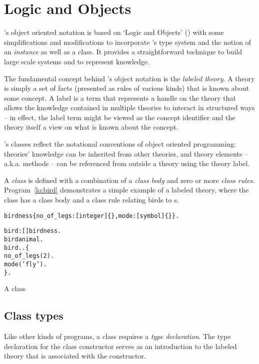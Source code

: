 \chapter{Logic and Objects}
\label{lo}

\go's object oriented notation is based on `Logic and Objects' (\cite{fgm:92}) with some simplifications and modifications to incorporate \go's type system and the notion of an \emph{instance} as well as a class. It provides a straightforward technique to build large scale systems and to represent knowledge. 

The fundamental concept behind \go's object notation is the \emph{labeled theory}. A theory is simply a set of facts (presented as rules of various kinds) that is known about some concept. A label is a term that represents a handle on the theory that allows the knowledge contained in multiple theories to interact in structured ways -- in effect, the label term might be viewed as the concept identifier and the theory itself a view on what is known about the concept.

\go's classes reflect the notational conventions of object oriented programming: theories' knowledge can be inherited from other theories, and theory elements -- a.k.a. methods -- can be referenced from outside a theory using the theory label.

A \emph{class} is defined with a combination of a \emph{class body} and zero or more \emph{class rules}. Program~\vref{lo:bird} demonstrates a simple example of a labeled theory, where the  class has a class body and a class rule relating birds to s.
\begin{program}
\begin{boxed}
\begin{alltt}
birdness \impl \{no\_of\_legs:[integer]\{\}, mode:[symbol]\{\}\}.

bird:[]\conarrow{}birdness.
bird\classarrow{}animal.
bird..\{
  no\_of\_legs(2).
  mode('fly').
\}.
\end{alltt}
\end{boxed}
\caption{\label{lo:bird}A  class}
\end{program}


\section{Class types}
\label{objects:classtype}

Like other kinds of programs, a class requires a \emph{type declaration}. The type declaration for the class constructor serves as an introduction to the labeled theory that is associated with the constructor. 

